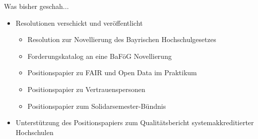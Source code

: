 \documentclass[compress, aspectratio=169]{beamer}
\begin{document}

\begin{frame}{Was bisher geschah...}
 \begin{itemize}
  \item Resolutionen verschickt und veröffentlicht
  \begin{itemize}
    \item Resolution zur Novellierung des Bayrischen Hochschulgesetzes
    \item Forderungskatalog an eine BaFöG Novellierung
    \item Positionspapier zu FAIR und Open Data im Praktikum
    \item Positionspapier zu Vertrauenspersonen
    \item Positionspapier zum Solidarsemester-Bündnis
   \end{itemize}
   \item Unterstützung des Positionspapiers zum Qualitätsbericht systemakkreditierter Hochschulen 
 \end{itemize}
\end{frame}
%
\end{document}
